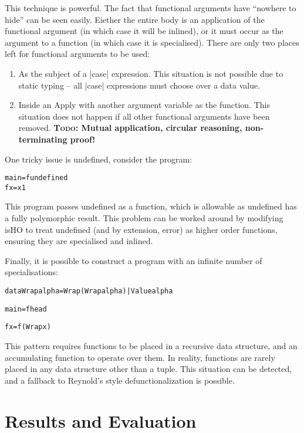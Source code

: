 \documentclass[preprint]{sigplanconf}
\newcommand{\C}[1]{\textsf{#1}}
\newcommand{\todo}[1]{\textbf{\textsc{Todo:} #1}}
\newenvironment{code}{\begin{alltt}\small}{\end{alltt}}
\begin{document}
This technique is powerful. The fact that functional arguments have ``nowhere to hide'' can be seen easily. Eiether the entire body is an application of the functional argument (in which case it will be inlined), or it must occur as the argument to a function (in which case it is specialised). There are only two places left for functional arguments to be used:

\begin{enumerate}
\item As the subject of a |case| expression. This situation is not possible due to static typing -- all |case| expressions must choose over a data value.

\item Inside an \C{Apply} with another argument variable as the function. This situation does not happen if all other functional arguments have been removed. \todo{Mutual application, circular reasoning, non-terminating proof!}
\end{enumerate}

One tricky issue is \C{undefined}, consider the program:

\begin{code}
main = f undefined
f x = x 1
\end{code}

This program passes \C{undefined} as a function, which is allowable as \C{undefined} has a fully polymorphic result. This problem can be worked around by modifying \C{isHO} to treat \C{undefined} (and by extension, \C{error}) as higher order functions, ensuring they are specialised and inlined.

Finally, it is possible to construct a program with an infinite number of specialisations:

\begin{code}
data Wrap alpha = Wrap (Wrap alpha) | Value alpha

main = f head

f x = f (Wrap x)
\end{code}

This pattern requires functions to be placed in a recursive data structure, and an accumulating function to operate over them. In reality, functions are rarely placed in any data structure other than a tuple. This situation can be detected, and a fallback to Reynold's style defunctionalization is possible.

\section{Results and Evaluation}
\label{sec:results}
\end{document}
